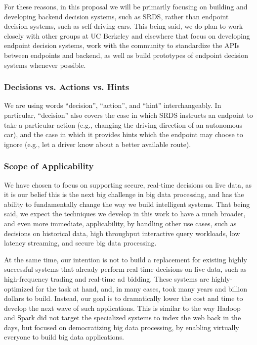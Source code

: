 For these reasons, in this proposal we will be primarily focusing on building and developing backend decision systems, such as SRDS, rather than endpoint decision systems, such as self-driving cars. This being said, we do plan to work closely with other groups at UC Berkeley and elsewhere that focus on developing endpoint decision systems, work with the community to standardize the APIs between endpoints and backend, as well as build prototypes of endpoint decision systems whenever possible.  

\subsubsection{Decisions vs. Actions vs. Hints}

We are using words ``decision'', ``action'', and ``hint'' interchangeably. In particular, “decision” also covers the case in which SRDS instructs an endpoint to take a particular action (e.g., changing the driving direction of an autonomous car), and the case in which it provides hints which the endpoint may choose to ignore (e.g., let a driver know about a better available route).    

\subsubsection{Scope of Applicability}

We have chosen to focus on supporting secure, real-time decisions on live data, as it is our belief this is the next big challenge in big data processing, and has the ability to fundamentally change the way we build intelligent systems. That being said, we expect the techniques we develop in this work to have a much broader, and even more immediate, applicability, by handling other use cases, such as decisions on historical data, high throughput interactive query workloads, low latency streaming, and secure big data processing.

At the same time, our intention is not to build a replacement for existing highly successful systems that already perform real-time decisions on live data, such as high-frequency trading and real-time ad bidding. These systems are highly-optimized for the task at hand, and, in many cases, took many years and billion dollars to build. Instead, our goal is to dramatically lower the cost and time to develop the next wave of such applications. This is similar to the way Hadoop and Spark did not target the specialized systems to index the web back in the days, but focused on democratizing big data processing, by enabling virtually everyone to build big data applications.
